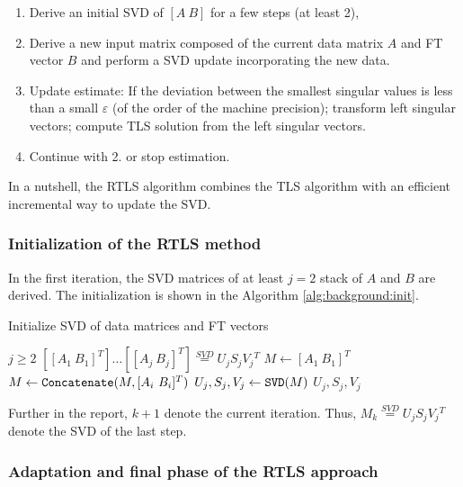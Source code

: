 \documentclass[/home/francois/latex/report/main.tex]{subfiles}
\begin{document}
\begin{enumerate}
  \item Derive an initial \ac{SVD} of $[A \ B]$ for a few steps (at least 2),
  \item Derive a new input matrix composed of the current data matrix $A$ and \ac{FT} vector $B$ and perform a \ac{SVD} update incorporating the new data.
  \item Update estimate: If the deviation between the smallest singular values is less than a small $\varepsilon$ (of the order of the machine precision); transform left singular vectors; compute \ac{TLS} solution from the left singular vectors.
  \item Continue with 2. or stop estimation.
\end{enumerate}

In a nutshell, the \ac{RTLS} algorithm combines the \ac{TLS} algorithm with an efficient incremental way to update the \ac{SVD}.

\subsubsection{Initialization of the \ac{RTLS} method}

In the first iteration, the \ac{SVD} matrices of at least $j=2$ stack of $A$ and $B$ are derived. The initialization is shown in the Algorithm \ref{alg:background:init}.

\begin{algorithm}
\caption{Initialize \ac{SVD} of data matrices and \ac{FT} vectors\label{alg:background:init}}
\begin{algorithmic}
\REQUIRE $j \geq 2$
\ENSURE $[[A_1 \ B_1]^T] \ldots [[A_j \ B_j]^T] \overset{SVD}{=} U_j S_j V_j {}^T$
\STATE $M \leftarrow [A_1 \ B_1]^T$
 \STATE $M \leftarrow \text{\texttt{Concatenate}}(M, [A_i \ B_i]^T)$
\ENDFOR
\STATE $U_j, S_j, V_j \leftarrow \text{\texttt{SVD}}(M)$
\RETURN $U_j, S_j, V_j$
\end{algorithmic}
\end{algorithm}

Further in the report, $k+1$ denote the current iteration. Thus, $M_k \overset{SVD}{=} U_j S_j V_j {}^T$ denote the \ac{SVD} of the last step.

\subsubsection{Adaptation and final phase of the \ac{RTLS} approach}
\end{document}
